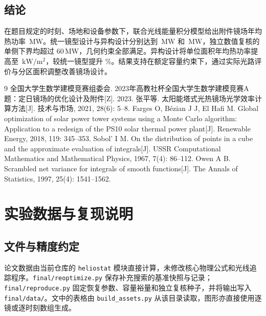 \documentclass[UTF8,a4paper,zihao=-4,fontset=mac]{ctexart}
\newcommand{\unitp}{\mathrm{kW}/\mathrm{m}^{2}}
\begin{document}
\subsection{结论}
在题目规定的时刻、场地和设备参数下，联合光线能量积分模型给出附件镜场年均热功率 \QoneP\,$\mathrm{MW}$。统一镜型设计与异构设计分别达到 \QtwoP\,$\mathrm{MW}$ 和 \QthreeP\,$\mathrm{MW}$，独立数值复核的单侧下界均超过 $60\,\mathrm{MW}$，几何约束全部满足。异构设计将单位面积年均热功率提高至 \QthreeJ\,$\unitp$，较统一镜型提升 \GainJ\%。结果支持在额定容量约束下，通过实际光路评价与分区面积调整改善镜场设计。

\begin{thebibliography}{9}
\small
{} 全国大学生数学建模竞赛组委会. 2023年高教社杯全国大学生数学建模竞赛A题：定日镜场的优化设计及附件[Z]. 2023.
 张平等. 太阳能塔式光热镜场光学效率计算方法[J]. 技术与市场, 2021, 28(6): 5--8.
 Farges O, Bézian J J, El Hafi M. Global optimization of solar power tower systems using a Monte Carlo algorithm: Application to a redesign of the PS10 solar thermal power plant[J]. Renewable Energy, 2018, 119: 345--353.
 Sobol' I M. On the distribution of points in a cube and the approximate evaluation of integrals[J]. USSR Computational Mathematics and Mathematical Physics, 1967, 7(4): 86--112.
 Owen A B. Scrambled net variance for integrals of smooth functions[J]. The Annals of Statistics, 1997, 25(4): 1541--1562.
\end{thebibliography}

\clearpage
\appendix
\section{实验数据与复现说明}
\subsection{文件与精度约定}
论文数据由当前仓库的 \texttt{heliostat} 模块直接计算，未修改核心物理公式和光线追踪程序。\texttt{final/reoptimize.py} 保存补充搜索的基准快照与记录；\texttt{final/reproduce.py} 固定恢复参数、容量裕量和独立复核种子，并将输出写入 \texttt{final/data/}。文中的表格由 \texttt{build\_assets.py} 从该目录读取，图形亦直接使用逐镜或逐时刻数组生成。
\end{document}
